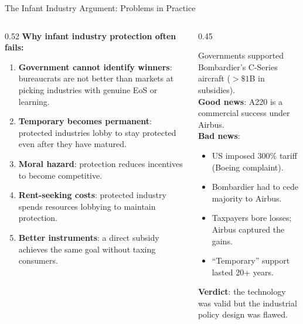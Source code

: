 \documentclass[aspectratio=169]{beamer}
\begin{document}
\begin{frame}{The Infant Industry Argument: Problems in Practice}
\begin{columns}
\begin{column}{0.52\textwidth}
\textbf{Why infant industry protection often fails:}
\begin{enumerate}
  \item \textbf{Government cannot identify winners}: bureaucrats are not better than markets at picking industries with genuine EoS or learning.
  \item \textbf{Temporary becomes permanent}: protected industries lobby to stay protected even after they have matured.
  \item \textbf{Moral hazard}: protection reduces incentives to become competitive.
  \item \textbf{Rent-seeking costs}: protected industry spends resources lobbying to maintain protection.
  \item \textbf{Better instruments}: a direct subsidy achieves the same goal without taxing consumers.
\end{enumerate}
\end{column}
\begin{column}{0.45\textwidth}
\begin{canadex}
  Governments supported Bombardier's C-Series aircraft ($>\$1$B in subsidies).\\[0.3em]
  \textbf{Good news}: A220 is a commercial success under Airbus.\\[0.3em]
  \textbf{Bad news}:
  \begin{itemize}\small
    \item US imposed 300\% tariff (Boeing complaint).
    \item Bombardier had to cede majority to Airbus.
    \item Taxpayers bore losses; Airbus captured the gains.
    \item ``Temporary'' support lasted 20+ years.
  \end{itemize}
  \textbf{Verdict}: the technology was valid but the industrial policy design was flawed.
\end{canadex}
\end{column}
\end{columns}
\end{frame}
\end{document}

